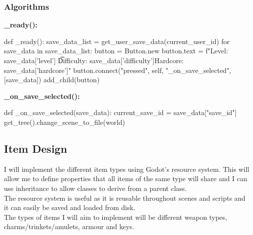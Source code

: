 \documentclass{article}
\begin{document}
        \subsubsection{Algorithms}
        \textbf{\_ready():}
        \begin{python}
def _ready():
   save_data_list = get_user_save_data(current_user_id)
   for save_data in save_data_list:
      button = Button.new
      button.text = f"Level: {save_data['level']} \t Difficulty: {save_data['difficulty']}\n Hardcore: {save_data['hardcore']}"
      button.connect("pressed", self, "_on_save_selected", [save_data])
      add_child(button)
        \end{python}
        \textbf{\_on\_save\_selected():}
        \begin{python}
def _on_save_selected(save_data):
   current_save_id = save_data["save_id"]
   get_tree().change_scene_to_file(world)
        \end{python}
        \subsection{Item Design}
        I will implement the different item types using Godot's resource system. This will allow me to define properties that all items of the same type will share and I can use inheritance to allow classes to derive from a parent class.\\
        The resource system is useful as it is reusable throughout scenes and scripts and it can easily be saved and loaded from disk.\\
        The types of items I will aim to implement will be different weapon types, charms/trinkets/amulets, armour and keys.\\
\end{document}
